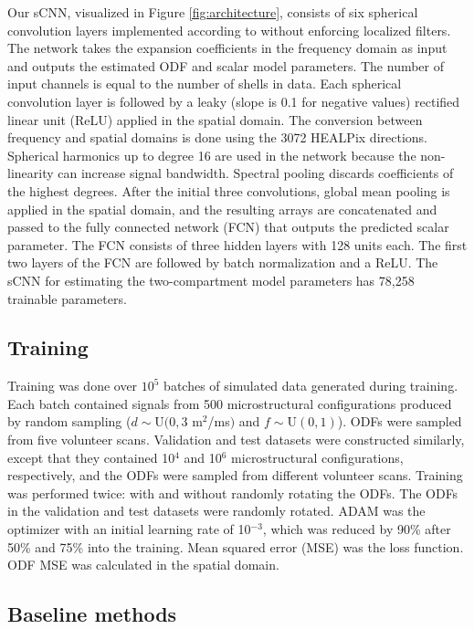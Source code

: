 \documentclass[10pt, letterpaper, oneside]{article}
\begin{document}
Our sCNN, visualized in Figure \ref{fig:architecture}, consists of six spherical convolution layers implemented according to \cite{esteves2018learning} without enforcing localized filters. The network takes the expansion coefficients in the frequency domain as input and outputs the estimated ODF and scalar model parameters. The number of input channels is equal to the number of shells in data. Each spherical convolution layer is followed by a leaky (slope is 0.1 for negative values) rectified linear unit (ReLU) applied in the spatial domain. The conversion between frequency and spatial domains is done using the 3072 HEALPix directions. Spherical harmonics up to degree 16 are used in the network because the non-linearity can increase signal bandwidth. Spectral pooling discards coefficients of the highest degrees. After the initial three convolutions, global mean pooling is applied in the spatial domain, and the resulting arrays are concatenated and passed to the fully connected network (FCN) that outputs the predicted scalar parameter. The FCN consists of three hidden layers with 128 units each. The first two layers of the FCN are followed by batch normalization \citep{ioffe2015batch} and a ReLU. The sCNN for estimating the two-compartment model parameters has 78,258 trainable parameters.
 
\subsection{Training}

Training was done over $10^5$ batches of simulated data generated during training. Each batch contained signals from 500 microstructural configurations produced by random sampling ($d \sim \text{U}(0, 3$ \textmu m$^2$/ms$)$ and $f \sim \text{U}(0, 1)$). ODFs were sampled from five volunteer scans. Validation and test datasets were constructed similarly, except that they contained 10$^4$ and 10$^6$ microstructural configurations, respectively, and the ODFs were sampled from different volunteer scans. Training was performed twice: with and without randomly rotating the ODFs. The ODFs in the validation and test datasets were randomly rotated. ADAM \citep{kingma2014adam} was the optimizer with an initial learning rate of 10$^{-3}$, which was reduced by 90\% after 50\% and 75\% into the training. Mean squared error (MSE) was the loss function. ODF MSE was calculated in the spatial domain.

\subsection{Baseline methods}
\end{document}
